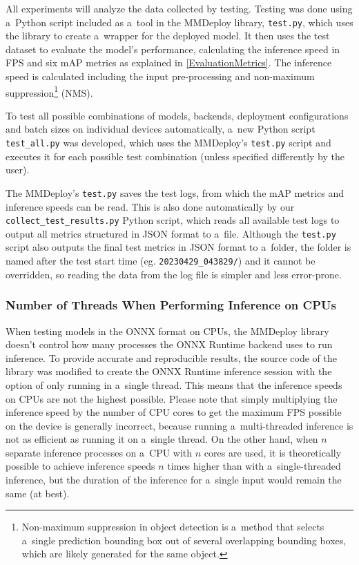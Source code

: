 All experiments will analyze the data collected by testing. Testing was done using
a~Python script included as a~tool in the MMDeploy library, \texttt{test.py},
which uses the library to create a~wrapper for the deployed model. It then uses
the test dataset to evaluate the model's performance, calculating the
inference speed in FPS and six mAP metrics as explained in
\autoref{EvaluationMetrics}. The inference speed is calculated including the
input pre-processing and non-maximum suppression\footnote{Non-maximum
suppression in object detection is a~method that selects a~single prediction
bounding box out of several overlapping bounding boxes, which are likely
generated for the same object.} (NMS).

To test all possible combinations of models, backends, deployment configurations
and batch sizes on individual devices automatically, a~new Python script
\texttt{test\_all.py} was developed, which uses the MMDeploy's \texttt{test.py}
script and executes it for each possible test combination (unless specified
differently by the user).

The MMDeploy's \texttt{test.py} saves the test logs, from which the mAP metrics
and inference speeds can be read. This is also done automatically by our
\texttt{collect\_test\_results.py} Python script, which reads all available test
logs to output all metrics structured in JSON format to a~file. Although the
\texttt{test.py} script also outputs the final test metrics in JSON format to
a~folder, the folder is named after the test start time (eg.
\texttt{20230429\_043829/}) and it cannot be overridden, so reading the data from
the log file is simpler and less error-prone.


\subsubsection*{Number of Threads When Performing Inference on CPUs}

When testing models in the ONNX format on CPUs, the MMDeploy library doesn't
control how many processes the ONNX Runtime backend uses to run inference. To
provide accurate and reproducible results, the source code of the library was
modified to create the ONNX Runtime inference session with the option of only
running in a~single thread. This means that the inference speeds on CPUs are not
the highest possible. Please note that simply multiplying the inference speed by
the number of CPU cores to get the maximum FPS possible on the device is
generally incorrect, because running a~multi-threaded inference is not as
efficient as running it on a~single thread. On the other hand, when $n$ separate
inference processes on a~CPU with $n$ cores are used, it is theoretically
possible to achieve inference speeds $n$ times higher than with
a~single-threaded inference, but the duration of the inference for a~single
input would remain the same (at best).



